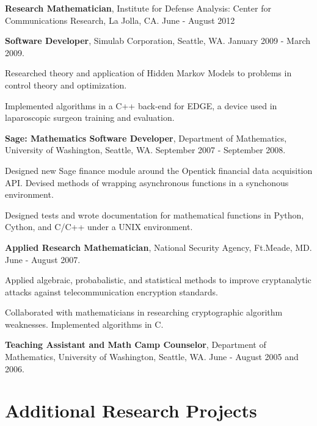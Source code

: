 \documentclass{article}
\begin{document}
\begin{itemize*}
  \setlength{\itemsep}{0pt}
  \item {\bf Research Mathematician}, Institute for Defense Analysis:
    Center for Communications Research, La Jolla, CA. June - August
    2012
  \item {\bf Software Developer}, Simulab Corporation, Seattle,
    WA. January 2009 - March 2009.
    \begin{itemize*}
    \item Researched theory and application of Hidden Markov Models to problems
      in control theory and optimization.
    \item Implemented algorithms in a C++ back-end for EDGE, a device used in
      laparoscopic surgeon training and evaluation.
    \end{itemize*}
  \item {\bf Sage: Mathematics Software Developer}, Department of
    Mathematics, University of Washington, Seattle, WA. September 2007
    - September 2008.
    \begin{itemize*}
    \item Designed new Sage finance module around the Opentick financial data
      acquisition API. Devised methods of wrapping asynchronous functions in a
      synchonous environment.
    \item Designed tests and wrote documentation for mathematical functions in
      Python, Cython, and C/C++ under a UNIX environment.
    \end{itemize*}
  \item {\bf Applied Research Mathematician}, National Security Agency,
    Ft.Meade, MD. June - August 2007.
    \begin{itemize*}
    \item Applied algebraic, probabalistic, and statistical methods to improve
      cryptanalytic attacks against telecommunication encryption standards.
    \item Collaborated with mathematicians in researching cryptographic
      algorithm weaknesses. Implemented algorithms in C.
    \end{itemize*}
  \item {\bf Teaching Assistant and Math Camp Counselor}, Department of
    Mathematics, University of Washington, Seattle, WA. June - August
    2005 and 2006.
\end{itemize*}

\section*{Additional Research Projects}
\end{document}
